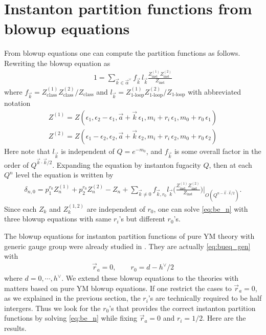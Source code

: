 \documentclass[12pt]{article}
\begin{document}
\section{Instanton partition functions from blowup equations}
From blowup equations one can compute the partition functions as follows. Rewriting the blowup equation as
\begin{align}
1=\sum_{\vec{k}\in\vec{\alpha}^{\lor}}f_{\vec{k}}\,l_{\vec{k}}\frac{Z^{(1)}_{\textrm{inst}}Z^{(2)}_{\textrm{inst}}}{Z_{\textrm{inst}}}
\end{align}
where $f_{\vec{k}}=Z^{(1)}_{\textrm{class}}Z^{(2)}_{\textrm{class}}/Z_{\textrm{class}}$ and $l_{\vec{k}}=Z^{(1)}_{\textrm{1-loop}}Z^{(2)}_{\textrm{1-loop}}/Z_{\textrm{1-loop}}$ with abbreviated notation 
\begin{align}
Z^{(1)}=Z(\epsilon_1,\epsilon_2-\epsilon_1,\vec{a}+\vec{k}\,\epsilon_1,m_i+r_i\,\epsilon_1,m_0+r_0\,\epsilon_1)\nonumber\\
Z^{(2)}=Z(\epsilon_1-\epsilon_2,\epsilon_2,\vec{a}+\vec{k}\,\epsilon_2,m_i+r_i\,\epsilon_2,m_0+r_0\,\epsilon_2)
\end{align} 
Here note that $l_{\vec{k}}$ is independent of $Q=e^{-m_0}$, and $f_{\vec{k}}$ is some overall factor in the order of $Q^{\vec{k}\cdot\vec{k}/2}$. Expanding the equation by instanton fugacity $Q$, then at each $Q^{n}$ level the equation is written by 
\begin{align}
\delta_{n,0}=p_1^{r_0}Z^{(1)}_{n}+p_2^{r_0}Z^{(2)}_{n}-Z_{n}+\sum_{\vec{k}\neq 0}f_{\vec{k},r_0}l_{\vec{k}}\Bigg(\frac{Z^{(1)}_{\textrm{inst}}Z^{(2)}_{\textrm{inst}}}{Z_{\textrm{inst}}}\Bigg)\Bigg|_{O(Q^{n-\vec{k}\cdot\vec{k}/2})}.
\label{eq:be_n}
\end{align}
Since each $Z_{k}$ and $Z^{(1,2)}_{k}$ are independent of $r_0$, one can solve \eqref{eq:be_n} with three blowup equations with same $r_i$'s but different $r_0$'s. 

The blowup equations for instanton partition functions of pure YM theory with generic gauge group were already studied in \cite{Keller:2012da}. They are actually \eqref{eq:bueq_gen} with 
\begin{align}
\vec{r}_a=0,\qquad r_0=d-h^{\lor}/2
\end{align}
where $d=0,\cdots, h^{\lor}$. We extend these blowup equations to the theories with matters based on pure YM blowup equations. If one restrict the cases to $\vec{r}_a=0$, as we explained in the previous section, the $r_i$'s are technically required to be half intergers. Thus we look for the $r_0$'s that provides the correct instanton partition functions by solving \eqref{eq:be_n} while fixing $\vec{r}_a=0$ and $r_i=1/2$. Here are the results.
\end{document}

